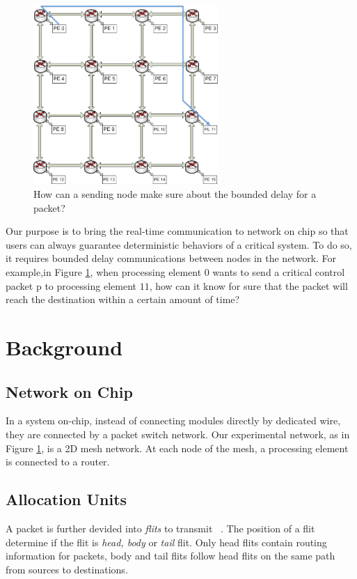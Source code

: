 \documentclass[conference, twocolumn]{IEEEtran}
\theoremstyle{definition}
\begin{document}
\begin{figure}[htp]
\centering
\includegraphics[width=7cm]{pics/NoC0}
\caption[Demand for a hard real-time flow.]
{How can a sending node make sure about the bounded delay for
a packet?}\label{fig:NoCRt}
\end{figure}

Our purpose is to bring the real-time communication to network on chip so that 
users can always guarantee deterministic behaviors of a critical system. To do 
so, it requires bounded delay communications between nodes in the network. 
For example,in Figure \ref{fig:NoCRt}, when processing element $0$ wants
to send a critical control packet p to processing element $11$, how can it know
for sure that the packet will reach the destination within a certain amount of time? 


\section{Background}
\subsection{Network on Chip}
In a system on-chip, instead of connecting modules directly by dedicated wire,
they are connected by a packet switch network. Our experimental network, as
in Figure \ref{fig:NoCRt}, is a 2D mesh network. At each node of the mesh, a
processing element is connected to a router.

\subsection{Allocation Units}
A packet is further devided into {\em flits} to transmit
~\cite{DallyPrinNetwork}. The position of a flit determine if the flit is {\em
head, body} or {\em tail} flit. Only head flits contain routing information for
packets, body and tail flits follow head flits on the same path from sources to
destinations.
\end{document}
